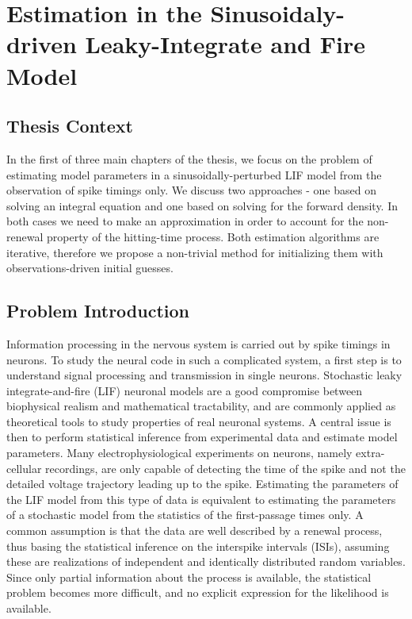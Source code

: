 \chapter{Estimation in the Sinusoidaly-driven Leaky-Integrate and Fire Model}
\label{ch:estimate}
\graphicspath{{../LIFEPaper/}}

 
\section{Thesis Context}
 In the first of three main chapters of the thesis, we focus on the problem of
 estimating model parameters in a sinusoidally-perturbed LIF model from the
 observation of spike timings only. We discuss two approaches - one based on
 solving an integral equation and one based on solving for the forward density.
 In both cases we need to make an approximation in order to account for the
 non-renewal property of the hitting-time process. 
Both estimation algorithms are iterative, therefore we propose a non-trivial
 method for initializing them with observations-driven initial guesses.  
 
\section{Problem Introduction} 
Information processing in the nervous system is carried out by spike timings in
neurons. To study the neural code in such a complicated system, a first step is
to understand signal processing and transmission in single neurons. Stochastic
leaky integrate-and-fire (LIF) neuronal models are a good compromise between
biophysical realism and mathematical tractability, and are commonly applied as
theoretical tools to study properties of real neuronal systems. A central issue
is then to perform statistical inference from experimental data and estimate
model parameters. Many electrophysiological experiments on neurons, namely
extra-cellular recordings, are only capable of detecting the time of the spike
and not the detailed voltage trajectory leading up to the spike. Estimating the
parameters of the LIF model from this type of data is equivalent to estimating
the parameters of a stochastic model from the statistics of the first-passage
times only. A common assumption is that the data are well described by a renewal
process, thus basing the statistical inference on the interspike intervals
(ISIs), assuming these are realizations of independent and identically
distributed random variables. Since only partial information about the process
is available, the statistical problem becomes more difficult, and no explicit
expression for the likelihood is available. 

